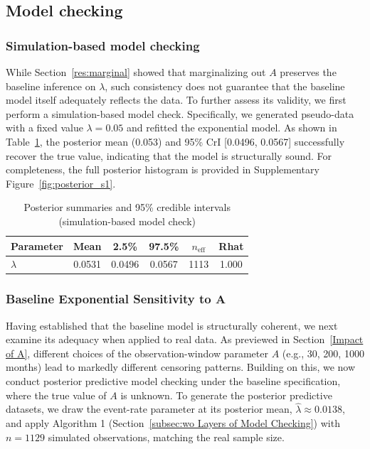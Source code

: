 \subsection{Model checking}
\subsubsection{Simulation-based model checking}
While Section~\ref{res:marginal} showed that marginalizing out $A$ preserves the baseline inference on $\lambda$, such consistency does not guarantee that the baseline model itself adequately reflects the data. To further assess its validity, we first perform a simulation-based model check. Specifically, we generated pseudo-data with a fixed value $\lambda=0.05$ and refitted the exponential model. As shown in Table~\ref{tab:post-ci}, the posterior mean (0.053) and 95\% CrI [0.0496, 0.0567] successfully recover the true value, indicating that the model is structurally sound. For completeness, the full posterior histogram is provided in Supplementary Figure~\ref{fig:posterior_s1}.
\begin{table}[H]
\centering
\caption{{\small Posterior summaries and 95\% credible intervals (simulation-based model check)}}
\label{tab:post-ci}
\small
\begin{tabular}{lccccc}
\toprule
{Parameter} & {Mean} & {2.5\%} & {97.5\%} & {$n_{\text{eff}}$} & {Rhat} \\
\midrule
$\lambda$   & 0.0531 & 0.0496 & 0.0567 & 1113 & 1.000 \\
\bottomrule
\end{tabular}
\end{table}
\subsubsection{Baseline Exponential Sensitivity to A}
\label{res:baseline_ecdf}
Having established that the baseline model is structurally coherent, we next examine its adequacy when applied to real data. As previewed in Section~\ref{Impact of A}, different choices of the observation-window parameter $A$ (e.g., 30, 200, 1000 months) lead to markedly different censoring patterns. Building on this, we now conduct posterior predictive model checking under the baseline specification, where the true value of $A$ is unknown. To generate the posterior predictive datasets, we draw the event-rate parameter at its posterior mean, $\hat{\lambda} \approx 0.0138$, and apply Algorithm 1 (Section~\ref{subsec:wo Layers of Model Checking}) with $n=1129$ simulated observations, matching the real sample size.

